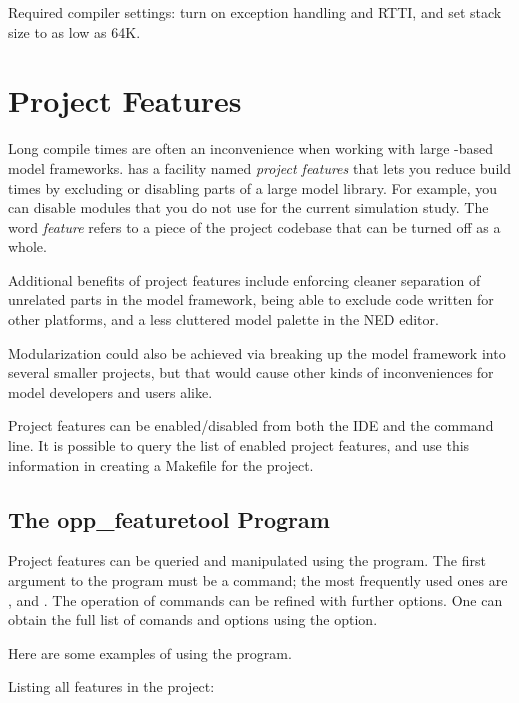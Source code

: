 Required compiler settings: turn on exception handling and RTTI, and
set stack size to as low as 64K.
\fi

\section{Project Features}
\label{sec:build-sim-progs:project-features}

Long compile times are often an inconvenience when working with large
{\opp}-based model frameworks. {\opp} has a facility named \textit{project
features} that lets you reduce build times by excluding or disabling parts
of a large model library. For example, you can disable modules that you do
not use for the current simulation study. The word \textit{feature} refers
to a piece of the project codebase that can be turned off as a whole.

Additional benefits of project features include enforcing cleaner
separation of unrelated parts in the model framework, being able to exclude
code written for other platforms, and a less cluttered model palette in the
NED editor.

\begin{note}
  Modularization could also be achieved via breaking up the model framework
  into several smaller projects, but that would cause other kinds of
  inconveniences for model developers and users alike.
\end{note}

Project features can be enabled/disabled from both the IDE and the command line.
It is possible to query the list of enabled project features, and use this
information in creating a Makefile for the project.

\subsection{The opp\_featuretool Program}
\label{sec:build-sim-progs:opp-featuretool}

Project features can be queried and manipulated using the 
program. The first argument to the program must be a command; the most frequently
used ones are ,  and . The operation of commands
can be refined with further options. One can obtain the full list of comands and
options using the  option.

Here are some examples of using the program.

Listing all features in the project:

